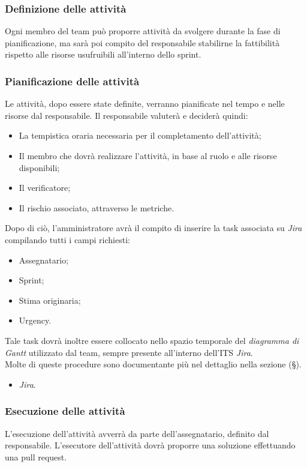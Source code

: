 \documentclass[10pt, a4paper]{article}
\begin{document}
\subsubsection{Definizione delle attività}
Ogni membro del team può proporre attività da svolgere durante la fase di pianificazione, ma sarà poi compito del responsabile stabilirne 
la fattibilità rispetto alle risorse usufruibili all'interno dello sprint.
\subsubsection{Pianificazione delle attività}
Le attività, dopo essere state definite, verranno pianificate nel tempo e nelle risorse dal responsabile. Il responsabile valuterà e deciderà quindi:
\begin{itemize}
    \item La tempistica oraria necessaria per il completamento dell'attività;
    \item Il membro che dovrà realizzare l'attività, in base al ruolo e alle risorse disponibili;
    \item Il verificatore;
    \item Il rischio associato, attraverso le metriche.
\end{itemize}
Dopo di ciò, l'amministratore avrà il compito di inserire la task associata su \textit{Jira} compilando tutti i campi richiesti:
\begin{itemize}
    \item Assegnatario;
    \item Sprint;
    \item Stima originaria;
    \item Urgency.
\end{itemize}
Tale task dovrà inoltre essere collocato nello spazio temporale del \textit{diagramma di Gantt} utilizzato dal team, sempre presente all'interno dell'ITS \textit{Jira}.\\
Molte di queste procedure sono documentante più nel dettaglio nella sezione (\S {}).
\begin{itemize}
    \item \textit{Jira}.
\end{itemize}
\subsubsection{Esecuzione delle attività}
L'esecuzione dell'attività avverrà da parte dell'assegnatario, definito dal responsabile. L'esecutore dell'attività dovrà proporre una soluzione 
effettuando una pull request.
\end{document}
